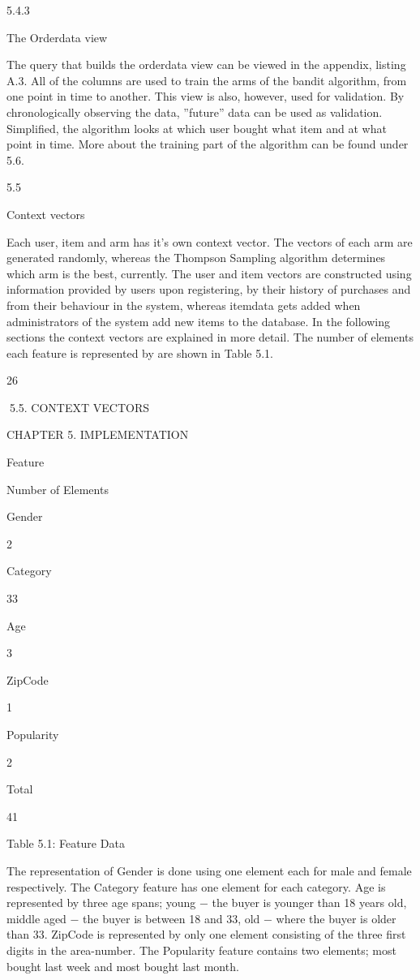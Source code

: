 5.4.3

The Orderdata view

The query that builds the orderdata view can be viewed in the appendix, listing A.3. All
of the columns are used to train the arms of the bandit algorithm, from one point in time
to another. This view is also, however, used for validation. By chronologically observing
the data, ”future” data can be used as validation. Simplified, the algorithm looks at
which user bought what item and at what point in time. More about the training part
of the algorithm can be found under 5.6.

5.5

Context vectors

Each user, item and arm has it’s own context vector. The vectors of each arm are generated randomly, whereas the Thompson Sampling algorithm determines which arm is the
best, currently. The user and item vectors are constructed using information provided
by users upon registering, by their history of purchases and from their behaviour in the
system, whereas itemdata gets added when administrators of the system add new items
to the database.
In the following sections the context vectors are explained in more detail. The number of elements each feature is represented by are shown in Table 5.1.

26

5.5. CONTEXT VECTORS

CHAPTER 5. IMPLEMENTATION

Feature

Number of Elements

Gender

2

Category

33

Age

3

ZipCode

1

Popularity

2

Total

41

Table 5.1: Feature Data

The representation of Gender is done using one element each for male and female respectively. The Category feature has one element for each category. Age is represented
by three age spans; young − the buyer is younger than 18 years old, middle aged −
the buyer is between 18 and 33, old − where the buyer is older than 33. ZipCode is
represented by only one element consisting of the three first digits in the area-number.
The Popularity feature contains two elements; most bought last week and most bought
last month.

